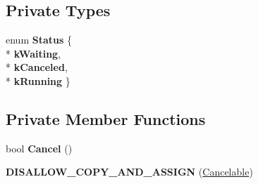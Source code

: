 \subsection*{Private Types}
\begin{DoxyCompactItemize}
\item 
enum {\bfseries Status} \{ \\*
{\bfseries k\+Waiting}, 
\\*
{\bfseries k\+Canceled}, 
\\*
{\bfseries k\+Running}
 \}\hypertarget{classv8_1_1internal_1_1_cancelable_aa3c71a2504630a3ab03c013e0003101a}{}\label{classv8_1_1internal_1_1_cancelable_aa3c71a2504630a3ab03c013e0003101a}

\end{DoxyCompactItemize}
\subsection*{Private Member Functions}
\begin{DoxyCompactItemize}
\item 
bool {\bfseries Cancel} ()\hypertarget{classv8_1_1internal_1_1_cancelable_a14c7e543dabdc2abfd0334b4ece2b00a}{}\label{classv8_1_1internal_1_1_cancelable_a14c7e543dabdc2abfd0334b4ece2b00a}

\item 
{\bfseries D\+I\+S\+A\+L\+L\+O\+W\+\_\+\+C\+O\+P\+Y\+\_\+\+A\+N\+D\+\_\+\+A\+S\+S\+I\+GN} (\hyperlink{classv8_1_1internal_1_1_cancelable}{Cancelable})\hypertarget{classv8_1_1internal_1_1_cancelable_ac357fcab37ef6e6342e7886dceaefadc}{}\label{classv8_1_1internal_1_1_cancelable_ac357fcab37ef6e6342e7886dceaefadc}

\end{DoxyCompactItemize}
